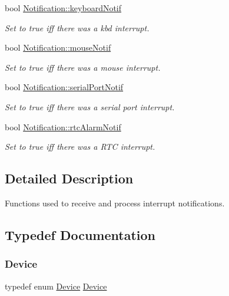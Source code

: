 \begin{DoxyCompactItemize}
bool \mbox{\hyperlink{group__interrupts_ga9bcd8935448dbeb1714a51b8af36c929}{Notification\+::keyboard\+Notif}}
\begin{DoxyCompactList}\small\item\em Set to true iff there was a kbd interrupt. \end{DoxyCompactList}\item 
bool \mbox{\hyperlink{group__interrupts_ga033b89a1119cf0bf3dea6ba7d9ef1373}{Notification\+::mouse\+Notif}}
\begin{DoxyCompactList}\small\item\em Set to true iff there was a mouse interrupt. \end{DoxyCompactList}\item 
bool \mbox{\hyperlink{group__interrupts_ga9776a545df6ef8cc680149db59bd8c1c}{Notification\+::serial\+Port\+Notif}}
\begin{DoxyCompactList}\small\item\em Set to true iff there was a serial port interrupt. \end{DoxyCompactList}\item 
bool \mbox{\hyperlink{group__interrupts_ga429c938e843b61640cb0100efcef89da}{Notification\+::rtc\+Alarm\+Notif}}
\begin{DoxyCompactList}\small\item\em Set to true iff there was a R\+TC interrupt. \end{DoxyCompactList}\end{DoxyCompactItemize}


\subsection{Detailed Description}
Functions used to receive and process interrupt notifications. 

\subsection{Typedef Documentation}
\mbox{\label{group__interrupts_ga190b45b11d58f95bf84392b54e437fdd}} 
\subsubsection{\texorpdfstring{Device}{Device}}
{\footnotesize\ttfamily typedef enum \mbox{\hyperlink{group__interrupts_gadb53a8cc97236ca207c035241a5b7fb8}{Device}}  \mbox{\hyperlink{group__interrupts_gadb53a8cc97236ca207c035241a5b7fb8}{Device}}}

